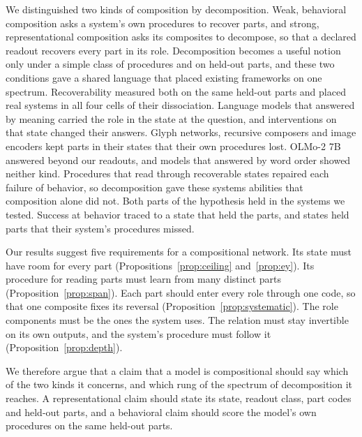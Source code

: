 \documentclass[10pt]{article}
\theoremstyle{plain}
\theoremstyle{remark}
\begin{document}
We distinguished two kinds of composition by decomposition. Weak, behavioral composition asks a system's own procedures to recover parts, and strong, representational composition asks its composites to decompose, so that a declared readout recovers every part in its role. Decomposition becomes a useful notion only under a simple class of procedures and on held-out parts, and these two conditions gave a shared language that placed existing frameworks on one spectrum. Recoverability measured both on the same held-out parts and placed real systems in all four cells of their dissociation. Language models that answered by meaning carried the role in the state at the question, and interventions on that state changed their answers. Glyph networks, recursive composers and image encoders kept parts in their states that their own procedures lost. OLMo-2 7B answered beyond our readouts, and models that answered by word order showed neither kind. Procedures that read through recoverable states repaired each failure of behavior, so decomposition gave these systems abilities that composition alone did not. Both parts of the hypothesis held in the systems we tested. Success at behavior traced to a state that held the parts, and states held parts that their system's procedures missed.

Our results suggest five requirements for a compositional network. Its state must have room for every part (Propositions~\ref{prop:ceiling} and~\ref{prop:ey}). Its procedure for reading parts must learn from many distinct parts (Proposition~\ref{prop:span}). Each part should enter every role through one code, so that one composite fixes its reversal (Proposition~\ref{prop:systematic}). The role components must be the ones the system uses. The relation must stay invertible on its own outputs, and the system's procedure must follow it (Proposition~\ref{prop:depth}).

We therefore argue that a claim that a model is compositional should say which of the two kinds it concerns, and which rung of the spectrum of decomposition it reaches. A representational claim should state its state, readout class, part codes and held-out parts, and a behavioral claim should score the model's own procedures on the same held-out parts.
\end{document}
